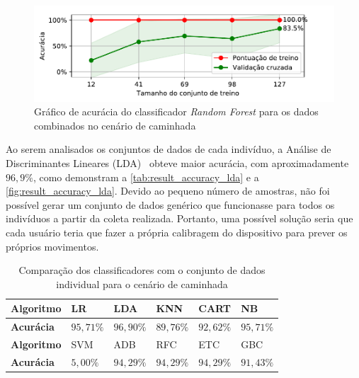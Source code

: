 \begin{figure}[ht]
	\caption{\label{fig:result_accuracy_rfc}Gráfico de acurácia do classificador \textit{Random Forest} para os dados combinados no cenário de caminhada}
	\begin{center}
		\includegraphics[width=\textwidth]{resources/result_accuracy_rfc}
	\end{center}
\end{figure}

Ao serem analisados os conjuntos de dados de cada indivíduo, a Análise de Discriminantes Lineares (LDA)~\cite{scikit:lda} obteve maior acurácia, com aproximadamente \(96{,}9\%\), como demonstram a \autoref{tab:result_accuracy_lda} e a \autoref{fig:result_accuracy_lda}. Devido ao pequeno número de amostras, não foi possível gerar um conjunto de dados genérico que funcionasse para todos os indivíduos a partir da coleta realizada. Portanto, uma possível solução seria que cada usuário teria que fazer a própria calibragem do dispositivo para prever os próprios movimentos.

\begin{table}[ht]
	\caption{Comparação dos classificadores com o conjunto de dados individual para o cenário de caminhada}%
	\label{tab:result_accuracy_lda}
	\begin{tabularx}{\textwidth}{X X X X X X}
		\toprule
		\textbf{Algoritmo} & LR            & LDA           & KNN           & CART          & NB            \\ \midrule
		\textbf{Acurácia}  & \(95{,}71\%\) & \(96{,}90\%\) & \(89{,}76\%\) & \(92{,}62\%\) & \(95{,}71\%\) \\ \bottomrule \toprule
		\textbf{Algoritmo} & SVM           & ADB           & RFC           & ETC           & GBC           \\ \midrule
		\textbf{Acurácia}  & \(5{,}00\%\)  & \(94{,}29\%\) & \(94{,}29\%\) & \(94{,}29\%\) & \(91{,}43\%\) \\ \bottomrule
	\end{tabularx}
\end{table}

